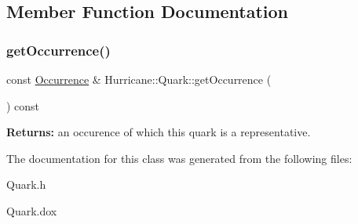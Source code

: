 \subsection{Member Function Documentation}
\mbox{\label{classHurricane_1_1Quark_a22ee192574dae1546ec17d6c549b2ca0}} 
\subsubsection{\texorpdfstring{get\+Occurrence()}{getOccurrence()}}
{\footnotesize\ttfamily const \hyperlink{classHurricane_1_1Occurrence}{Occurrence} \& Hurricane\+::\+Quark\+::get\+Occurrence (\begin{DoxyParamCaption}{ }\end{DoxyParamCaption}) const\hspace{0.3cm}{\ttfamily [inline]}}

{\bfseries Returns\+:} an occurence of which this quark is a representative. 

The documentation for this class was generated from the following files\+:\begin{DoxyCompactItemize}
\item 
Quark.\+h\item 
Quark.\+dox\end{DoxyCompactItemize}
